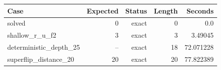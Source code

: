 {\small
\begin{tabular}{lrrrr}
\hline
Case & Expected & Status & Length & Seconds \\
\hline
solved & 0 & exact & 0 & 0.0 \\
shallow\_r\_u\_f2 & 3 & exact & 3 & 3.49045 \\
deterministic\_depth\_25 & -- & exact & 18 & 72.071228 \\
superflip\_distance\_20 & 20 & exact & 20 & 77.822389 \\
\hline
\end{tabular}
}
